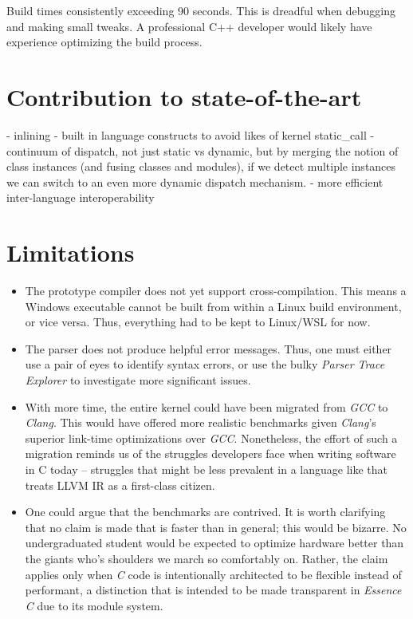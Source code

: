\documentclass[12pt,a4paper,twoside]{report}
\begin{document}
Build times consistently exceeding 90 seconds. This is dreadful when debugging and making small tweaks. A professional C++ developer would likely have experience optimizing the build process.

\section{Contribution to state-of-the-art}

- inlining
- built in language constructs to avoid likes of kernel static\_call
- continuum of dispatch, not just static vs dynamic, but by merging the notion of class instances (and fusing classes and modules), if we detect multiple instances we can switch to an even more dynamic dispatch mechanism.
- more efficient inter-language interoperability

\section{Limitations}

\begin{itemize}
  \item The prototype compiler does not yet support cross-compilation. This means a Windows executable cannot be built from within a Linux build environment, or vice versa. Thus, everything had to be kept to Linux/WSL for now.
  \item The parser does not produce helpful error messages. Thus, one must either use a pair of eyes to identify syntax errors, or use the bulky \textit{Parser Trace Explorer} to investigate more significant issues.
  \item With more time, the entire kernel could have been migrated from \textit{GCC} to \textit{Clang}. This would have offered more realistic benchmarks given \textit{Clang}'s superior link-time optimizations over \textit{GCC}. Nonetheless, the effort of such a migration reminds us of the struggles developers face when writing software in C today -- struggles that might be less prevalent in a language like  that treats LLVM IR as a first-class citizen.
  \item One could argue that the benchmarks are contrived. It is worth clarifying that no claim is made that  is faster than  in general; this would be bizarre. No undergraduated student would be expected to optimize hardware better than the giants who's shoulders we march so comfortably on. Rather, the claim applies only when \textit{C} code is intentionally architected to be flexible instead of performant, a distinction that is intended to be made transparent in \textit{Essence C} due to its module system.
  
\end{itemize}
\end{document}

